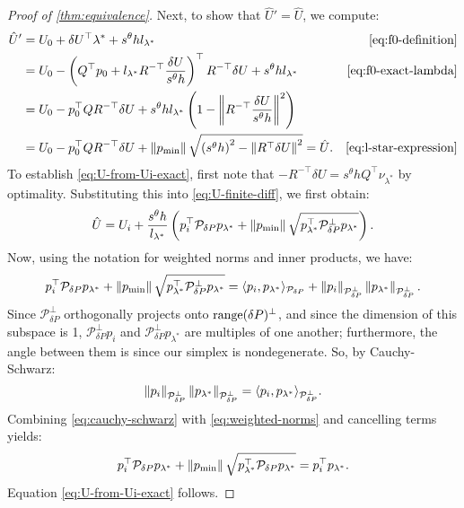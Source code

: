 \documentclass[sisc-eikonal.tex]{subfiles}
\begin{document}
\begin{proof}[Proof of \cref{thm:equivalence}]
  Next, to show that $\hat{U}' = \hat{U}$, we compute:
  \begin{align*}
    \hat{U}'
    &= U_0 + \delta U^\top \lambda^* + s^\theta h l_{\lambda^*} & \cref{eq:f0-definition} \\
    &= U_0 - \parens{Q^\top p_0 + l_{\lambda^*} R^{-\top} \frac{\delta U}{s^\theta h}}^\top R^{-\top} \delta U + s^\theta h l_{\lambda^*} & \cref{eq:f0-exact-lambda} \\
    &= U_0 - p_0^\top Q R^{-\top} \delta U + s^\theta h l_{\lambda^*} \parens{1 - \norm{R^{-\top} \frac{\delta U}{s^\theta h}}^2} \\
    &= U_0 - p_0^\top Q R^{-\top} \delta U + \norm{\pmin} \sqrt{\parens{s^\theta h}^2 - \norm{R^\top \delta U}^2} = \hat{U}. & \cref{eq:l-star-expression}
  \end{align*}
  To establish \cref{eq:U-from-Ui-exact}, first note that
  $-R^{-\top} \delta U = s^\theta h Q^\top \nu_{\lambda^*}$ by
  optimality. Substituting this into \cref{eq:U-finite-diff}, we first
  obtain:
  \begin{equation}
    \hat{U} = U_i + \frac{s^\theta h}{l_{\lambda^*}} \left(p_i^\top \mathcal{P}_{\delta P} p_{\lambda^*} + \left\|p_{\operatorname{min}}\right\| \sqrt{p_{\lambda^*}^\top \mathcal{P}^\perp_{\delta P} p_{\lambda^*}}\right).
  \end{equation}
  Now, using the notation for weighted norms and inner products, we have:
  \begin{equation}\label{eq:weighted-norms}
    p_i^\top \mathcal{P}_{\delta P} p_{\lambda^*} + \norm{\pmin} \sqrt{p_{\lambda^*}^\top \mathcal{P}^\perp_{\delta P} p_{\lambda^*}} = \langle p_i, p_{\lambda^*} \rangle_{\mathcal{P}_{\delta P}} + \norm{p_i}_{\mathcal{P}^\perp_{\delta P}} \norm{p_{\lambda^*}}_{\mathcal{P}^\perp_{\delta P}}.
  \end{equation}
  Since $\mathcal{P}^\perp_{\delta P}$ orthogonally projects onto
  $\operatorname{range}(\delta P)^\perp$, and since the dimension of this subspace
  is 1, $\mathcal{P}^\perp_{\delta P} p_i$ and
  $\mathcal{P}^\perp_{\delta P} p_{\lambda^*}$ are multiples of one
  another; furthermore, the angle between them is since our simplex is
  nondegenerate. So, by Cauchy-Schwarz:
  \begin{equation}\label{eq:cauchy-schwarz}
    \norm{p_i}_{\mathcal{P}^\perp_{\delta P}} \norm{p_{\lambda^*}}_{\mathcal{P}^\perp_{\delta P}} = \langle p_i, p_{\lambda^*} \rangle_{\mathcal{P}^\perp_{\delta P}}.
  \end{equation}
  Combining \cref{eq:cauchy-schwarz} with \cref{eq:weighted-norms} and
  cancelling terms yields:
  \begin{equation}
    p_i^\top \mathcal{P}_{\delta P} p_{\lambda^*} + \left\|p_{\operatorname{min}}\right\| \sqrt{p_{\lambda^*}^\top \mathcal{P}_{\delta P} p_{\lambda^*}} = p_i^\top p_{\lambda^*}.
  \end{equation}
  Equation \cref{eq:U-from-Ui-exact} follows.


\end{proof}
\end{document}
